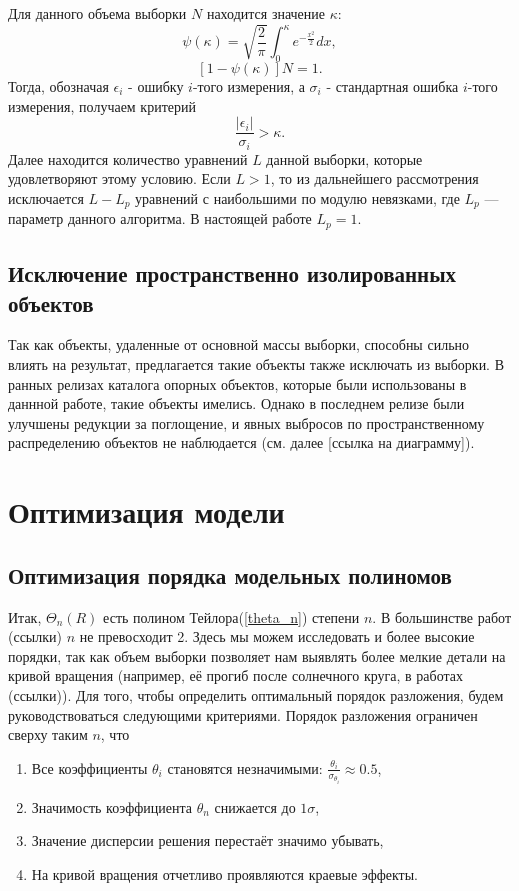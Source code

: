 \documentclass{matmex-diploma-custom}
\begin{document}
\par Для данного объема выборки $N$ находится значение $\kappa$:
\begin{equation}
\psi (\kappa) = \sqrt{\frac{2}{\pi}} \int_0^{\kappa} e^{- \frac{x^2}{2}} dx,
\end{equation}
\begin{equation}
\left[ 1 - \psi (\kappa) \right] N = 1.
\end{equation}
Тогда, обозначая $\epsilon_i$ - ошибку $i$-того измерения, а $\sigma_i$ - стандартная ошибка $i$-того измерения, получаем критерий
\begin{equation} \label{criteria}
\frac{\left| \epsilon_i \right|}{\sigma_i} > \kappa.
\end{equation}
Далее находится количество уравнений $L$ данной выборки, которые удовлетворяют этому условию. Если $L > 1$, то из дальнейшего рассмотрения исключается $L - L_p$ уравнений с наибольшими по модулю невязками, где $L_p$ — параметр данного алгоритма.  В настоящей работе $L_p = 1$.

\subsection{Исключение пространственно изолированных объектов}
Так как объекты, удаленные от основной массы выборки, способны сильно влиять на результат, предлагается такие объекты также исключать из выборки. В ранных релизах каталога опорных объектов, которые были использованы в даннной работе, такие объекты имелись. Однако в последнем релизе были улучшены редукции за поглощение, и явных выбросов по пространственному распределению объектов не наблюдается (см. далее [ссылка на диаграмму]).

\section{Оптимизация модели}
\subsection{Оптимизация порядка модельных полиномов}
Итак, $\Theta_n(R)$ есть полином Тейлора(\ref{theta_n}) степени $n$. В большинстве работ (ссылки) $n$ не превосходит 2. Здесь мы можем исследовать и более высокие порядки, так как объем выборки позволяет нам выявлять более мелкие детали на кривой вращения (например, её прогиб после солнечного круга, в работах (ссылки)). Для того, чтобы определить оптимальный порядок разложения, будем руководствоваться следующими критериями.
Порядок разложения ограничен сверху таким $n$, что
\begin{enumerate}
        \item Все коэффициенты $\theta_i$ становятся незначимыми: $\frac{\theta_i}{\sigma_{\theta_i}}\approx 0.5$, \label{crit_1}
        \item Значимость коэффициента $\theta_n$ снижается до $1 \sigma$,  \label{crit_2}
        \item Значение дисперсии решения перестаёт значимо убывать, \label{crit_3}
        \item На кривой вращения отчетливо проявляются краевые эффекты. \label{crit_4}
\end{enumerate}
\end{document}

